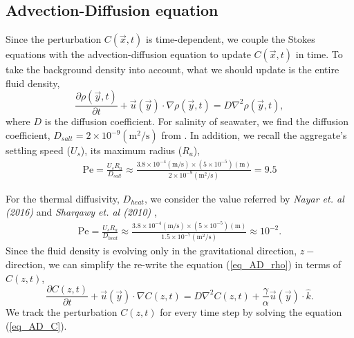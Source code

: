 \subsection{Advection-Diffusion equation}
Since the perturbation $C(\vec{x}, t)$ is time-dependent, we couple the Stokes equations with the advection-diffusion equation to update $C(\vec{x}, t)$ in time. To take the background density into account, what we should update is the entire fluid density,
\begin{equation}
	\frac{\partial \rho(\vec{y},t)}{\partial t}
	+ \vec{u}(\vec{y}) \cdot \nabla \rho(\vec{y},t)
	 = D \nabla^2 \rho(\vec{y},t),
\label{eq_AD_rho}
\end{equation}
where $D$ is the diffusion coefficient.
For salinity of seawater, we find the diffusion coefficient, $D_{salt} = 2 \times 10^{-9}  (\text{m}^2\text{/s})$ from  \cite{wollast_diffusion_1971}. In addition, we recall the aggregate's settling speed ($U_s$), its maximum radius ($R_a$),
\begin{align}
	\text{Pe} 
	= \frac{U_s R_a }{D_{salt}} 
	\approx \frac{3.8 \times 10^{-4}(\text{m/s}) \times \left(5 \times 10^{-5} \right) (\text{m})}{2 \times 10^{-9} (\text{m}^2\text{/s})} = 9.5
\end{align}
\par 
For the thermal diffusivity, $D_{heat}$, we consider the value referred by {\it Nayar et. al (2016)} \cite{nayar_thermophysical_2016} and {\it Sharqawy et. al (2010)} \cite{sharqawy_thermophysical_2010},
\begin{align}
	\text{Pe} 
	= \frac{U_s R_a }{D_{heat}} 
	\approx \frac{3.8 \times 10^{-4}(\text{m/s}) \times \left(5 \times 10^{-5} \right) (\text{m})}{1.5 \times 10^{-7} (\text{m}^2\text{/s})} \approx 10^{-2}.
\end{align} 
Since the fluid density is evolving only in the gravitational direction, $z-$direction, we can simplify the re-write the equation (\ref{eq_AD_rho}) in terms of $C(z,t)$, 
\begin{equation}
	\frac{\partial C(z,t)}{\partial t}
	+ \vec{u}(\vec{y}) \cdot \nabla C(z,t)
	 = D \nabla^2 C(z,t)
	 + \frac{\gamma}{\alpha}\vec{u}(\vec{y})  \cdot \hat{k}.
\label{eq_AD_C}
\end{equation}
We track the perturbation $C(z,t)$ for every time step by solving the equation (\ref{eq_AD_C}).
